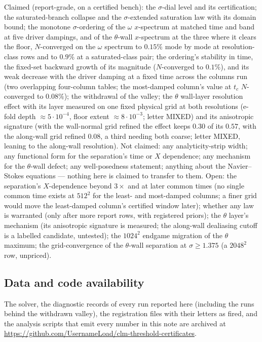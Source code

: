 \documentclass[11pt,a4paper]{article}
\begin{document}
Claimed (report-grade, on a certified bench): the $\sigma$-dial level and its certification; the saturated-branch collapse and the $\sigma$-extended saturation law with its domain bound; the monotone $\sigma$-ordering of the $\omega$ $x$-spectrum at matched time and band at five driver dampings, and of the $\theta$-wall $x$-spectrum at the three where it clears the floor, $N$-converged on the $\omega$ spectrum to $0.15\%$ mode by mode at resolution-class rows and to $0.9\%$ at a saturated-class pair; the ordering's stability in time, the fixed-set backward growth of its magnitude ($N$-converged to $0.1\%$), and its weak decrease with the driver damping at a fixed time across the columns run (two overlapping four-column tables; the most-damped column's value at $t_c$ $N$-converged to $0.08\%$); the withdrawal of the valley; the $\theta$ wall-layer resolution effect with its layer measured on one fixed physical grid at both resolutions (e-fold depth $\approx5\cdot10^{-4}$, floor extent $\approx8\cdot10^{-3}$; letter MIXED) and its anisotropic signature (with the wall-normal grid refined the effect keeps $0.30$ of its $0.57$, with the along-wall grid refined $0.08$, a third needing both coarse; letter MIXED, leaning to the along-wall resolution). Not claimed: any analyticity-strip width; any functional form for the separation's time or $X$ dependence; any mechanism for the $\theta$-wall defect; any well-posedness statement; anything about the Navier--Stokes equations --- nothing here is claimed to transfer to them. Open: the separation's $X$-dependence beyond $3\times$ and at later common times (no single common time exists at $512^2$ for the least- and most-damped columns; a finer grid would move the least-damped column's certified window later); whether any law is warranted (only after more report rows, with registered priors); the $\theta$ layer's mechanism (its anisotropic signature is measured; the along-wall dealiasing cutoff is a labelled candidate, untested); the $1024^2$ endgame migration of the $\theta$ maximum; the grid-convergence of the $\theta$-wall separation at $\sigma\ge1.375$ (a $2048^2$ row, unpriced).

\subsection*{Data and code availability}
The solver, the diagnostic records of every run reported here (including the runs behind the withdrawn valley), the registration files with their letters as fired, and the analysis scripts that emit every number in this note are archived at \url{https://github.com/UsernameLoad/clm-threshold-certificates}.
\end{document}
